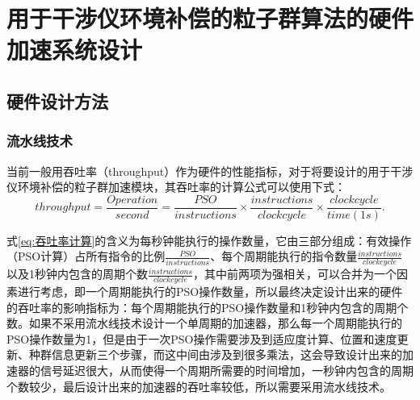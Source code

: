 \chapter{用于干涉仪环境补偿的粒子群算法的硬件加速系统设计}
\section{硬件设计方法}
\subsection{流水线技术}
\label{流水线技术}
当前一般用吞吐率（throughput）作为硬件的性能指标，对于将要设计的用于干涉仪环境补偿的粒子群加速模块，其吞吐率的计算公式可以使用下式：
\begin{equation}\label{eq:吞吐率计算}
    throughput = \frac{Operation}{second}=\frac{PSO}{instructions}\times \frac{instructions}{clock cycle} \times \frac{clock cycle}{time(1s)}.
    \end{equation}

式\eqref{eq:吞吐率计算}的含义为每秒钟能执行的操作数量，它由三部分组成：有效操作（PSO计算）占所有指令的比例$\frac{PSO}{instructions}$、每个周期能执行的指令数量$\frac{instructions}{clock cycle}$以及1秒钟内包含的周期个数$\frac{instructions}{clock cycle}$，其中前两项为强相关，可以合并为一个因素进行考虑，即一个周期能执行的PSO操作数量，所以最终决定设计出来的硬件的吞吐率的影响指标为：每个周期能执行的PSO操作数量和1秒钟内包含的周期个数。如果不采用流水线技术设计一个单周期的加速器，那么每一个周期能执行的PSO操作数量为1，但是由于一次PSO操作需要涉及到适应度计算、位置和速度更新、种群信息更新三个步骤，而这中间由涉及到很多乘法，这会导致设计出来的加速器的信号延迟很大，从而使得一个周期所需要的时间增加，一秒钟内包含的周期个数较少，最后设计出来的加速器的吞吐率较低，所以需要采用流水线技术。

